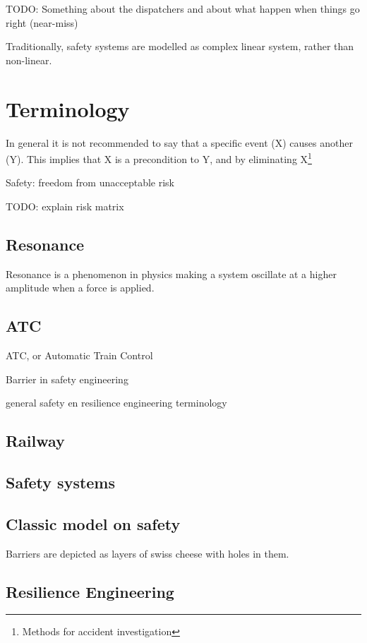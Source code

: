 
TODO: Something about the dispatchers and about what happen when things go right (near-miss)


Traditionally, safety systems are modelled as complex linear system, rather than non-linear.

\chapter{Terminology}
In general it is not recommended to say that a specific event (X) causes another (Y). This implies that X is a precondition to Y, and by eliminating X\footnote{Methods for accident investigation}

Safety: freedom from unacceptable risk

TODO: explain risk matrix

\section{Resonance}

Resonance is a phenomenon in physics making a system oscillate at a higher amplitude when a force is applied.

\section{ATC}
ATC, or Automatic Train Control

Barrier in safety engineering

general safety en resilience engineering terminology

\section{Railway}

\section{Safety systems}

\section{Classic model on safety}
Barriers are depicted as layers of swiss cheese with holes in them. 

\section{Resilience Engineering}
\label{sec:resilience_engineering}

